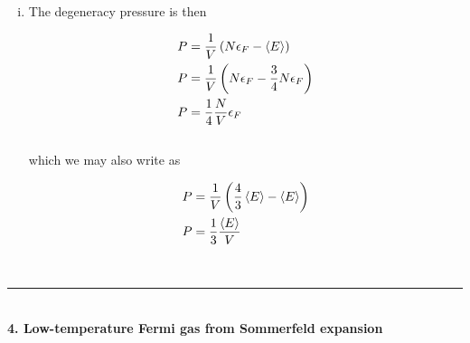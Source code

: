 \documentclass[]{article}
\begin{document}
\begin{enumerate}[i.]
\item The degeneracy pressure is then

\begin{equation}\label{eq:23}
\begin{aligned}
P & =  \frac{1}{V} \left( N \epsilon_F -  \expval{E}\right) \\
P & =  \frac{1}{V} \left( N \epsilon_F -  \frac{3}{4 } N \epsilon_F   \right) \\
P & =  \frac{ 1} {4} \frac{N}{V} \epsilon_F  \\
\end{aligned}
\end{equation} \\

which we may also write as 

\begin{equation}\label{eq:24}
\begin{aligned}
P & =  \frac{1}{V} \left( \frac{4}{3} \expval{E}  -  \expval{E}  \right) \\
P & =    \frac{1}{3}  \frac{\expval{E} }{V}   \\
\end{aligned}
\end{equation} 



\end{enumerate}

\hfill \\
\noindent\rule{15cm}{0.4pt} \\



{\bf  4. Low-temperature Fermi gas from Sommerfeld expansion} \\
\end{document}
